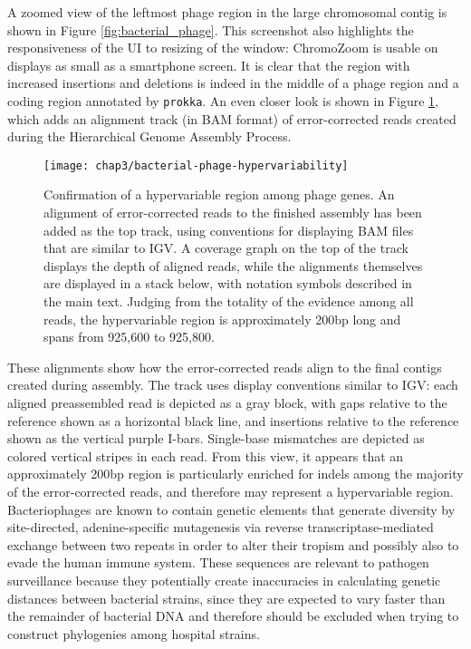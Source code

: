 A zoomed view of the leftmost phage region in the large chromosomal contig is shown in Figure \ref{fig:bacterial_phage}. This screenshot also highlights the responsiveness of the UI to resizing of the window: ChromoZoom is usable on displays as small as a smartphone screen. It is clear that the region with increased insertions and deletions is indeed in the middle of a phage region and a coding region annotated by \texttt{prokka}. An even closer look is shown in Figure \ref{fig:bacterial_phage_variability}, which adds an alignment track (in BAM format) of error-corrected reads created during the Hierarchical Genome Assembly Process.
\begin{figure}
  \texttt{[image: chap3/bacterial-phage-hypervariability]}               
  \caption[Confirmation of a hypervariable region among phage genes]{Confirmation of a hypervariable region among phage genes. An alignment of error-corrected reads to the finished assembly has been added as the top track, using conventions for displaying BAM files that are similar to IGV. A coverage graph on the top of the track displays the depth of aligned reads, while the alignments themselves are displayed in a stack below, with notation symbols described in the main text. Judging from the totality of the evidence among all reads, the hypervariable region is approximately 200bp long and spans from 925,600 to 925,800.}
  \label{fig:bacterial_phage_variability}
\end{figure}
These alignments show how the error-corrected reads align to the final contigs created during assembly. The track uses display conventions similar to IGV:\autocite{Thorvaldsdottir2013} each aligned preassembled read is depicted as a gray block, with gaps relative to the reference shown as a horizontal black line, and insertions relative to the reference shown as the vertical purple I-bars. Single-base mismatches are depicted as colored vertical stripes in each read. From this view, it appears that an approximately 200bp region is particularly enriched for indels among the majority of the error-corrected reads, and therefore may represent a hypervariable region. Bacteriophages are known to contain genetic elements that generate diversity by site-directed, adenine-specific mutagenesis via reverse transcriptase-mediated exchange between two repeats in order to alter their tropism and possibly also to evade the human immune system.\autocite{Liu2004,Minot2012} These sequences are relevant to pathogen surveillance because they potentially create inaccuracies in calculating genetic distances between bacterial strains, since they are expected to vary faster than the remainder of bacterial DNA and therefore should be excluded when trying to construct phylogenies among hospital strains.

